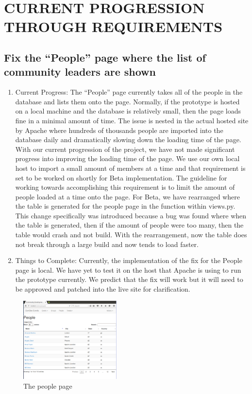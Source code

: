 \documentclass[letterpaper,10pt,onecolumn]{IEEEtran} %
\begin{document}
\section{CURRENT PROGRESSION THROUGH REQUIREMENTS}

\subsection{Fix the “People” page where the list of community leaders are shown}
\begin{enumerate}[label*=\arabic*.]
\item Current Progress: The “People” page currently takes all of the people in the database and lists them onto the page. Normally, if the prototype is hosted on a local machine and the database is relatively small, then the page loads fine in a minimal amount of time. The issue is nested in the actual hosted site by Apache where hundreds of thousands people are imported into the database daily and dramatically slowing down the loading time of the page. With our current progression of the project, we have not made significant progress into improving the loading time of the page. We use our own local host to import a small amount of members at a time and that requirement is set to be worked on shortly for Beta implementation. The guideline for working towards accomplishing this requirement is to limit the amount of people loaded at a time onto the page. For Beta, we have rearranged where the table is generated for the people page in the function within views.py. This change specifically was introduced because a bug was found where when the table is generated, then if the amount of people were too many, then the table would crash and not build. With the rearrangement, now the table does not break through a large build and now tends to load faster.

\item Things to Complete: Currently, the implementation of the fix for the People page is local. We have yet to test it on the host that Apache is using to run the prototype currently. We predict that the fix will work but it will need to be approved and patched into the live site for clarification.
\end{enumerate}

\begin{figure}[htp]
  \begin{center}
  
  \includegraphics[width=2in]{peoplePage}
  \centering
  \caption{The people page}

  \end{center}
\end{figure}
\end{document}
